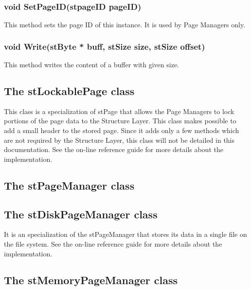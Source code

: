 \subsubsection{void SetPageID(stpageID pageID)}
This method sets the page ID of this instance. It is used by Page Managers only.

\subsubsection{void Write(stByte * buff, stSize size, stSize offset)}
This method writes the content of a buffer with given size.

\subsection{The stLockablePage class}

This class is a specialization of stPage that allows the Page Managers to lock portions of the page data to the Structure Layer. This class makes possible to add a small header to the stored page. Since it adds only a few methods which are not required by the Structure Layer, this class will not be detailed in this documentation. See the on-line reference guide \cite{onlineman} for more details about the implementation.

\subsection{The stPageManager class}

\subsection{The stDiskPageManager class}

It is an specialization of the stPageManager that stores its data in a single file on the file system. See the on-line reference guide \cite{onlineman} for more details about the implementation.

\subsection{The stMemoryPageManager class}

